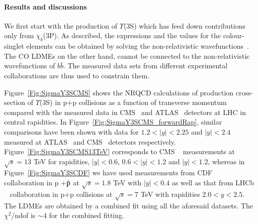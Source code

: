 \paragraph{Results and discussions}
\label{sec:results}
We first start with the production of $\Upsilon$(3S) which has feed down contributions
only from $\chi_{b}$(3P).
As described, the expressions and the values for the 
colour-singlet elements can be obtained by solving the non-relativistic 
wavefunctions~\cite{Cho:1995vh}. 
The CO LDMEs on the other hand, cannot be connected to the non-relativistic
wavefunctions of $b \bar b$. 
The measured data sets from different experimental collaborations are thus used to constrain them.

Figure~\ref{Fig:SigmaY3SCMS} shows the NRQCD calculations of production cross-section of 
$\Upsilon$(3S) in p+p collisions as a function of transverse momentum compared with the 
measured data in CMS~\cite{Khachatryan:2015qpa} and ATLAS~\cite{Aad:2012dlq} 
detectors at LHC in central rapidities. In Figure~\ref{Fig:SigmaY3SCMS_forwardRap},
similar comparisons have been shown with data for $1.2<|y|<2.25$ and $|y|<2.4$
measured at ATLAS~\cite{Aad:2012dlq} and CMS~\cite{Chatrchyan:2013yna} detectors 
respectively. Figure~\ref{Fig:SigmaY3SCMS13TeV} corresponds to CMS ~\cite{Sirunyan:2017qdw}
measurements at $\sqrt{s}=13$ TeV for rapidities, $|y|<0.6$, $0.6<|y|<1.2$ and $|y|<1.2$, whereas in 
Figure~\ref{Fig:SigmaY3SCDF} we have used measurements from CDF~\cite{Acosta:2001gv}
collaboration in p +{$\bar {\rm p}$} at $\sqrt{s}=1.8$ TeV with $|y|<0.4$ as well as
that from LHCb ~\cite{LHCb:2012aa}
collaboration in p+p collisions at $\sqrt{s}=7$ TeV with rapidities $2.0<y<2.5$.
The LDMEs are obtained by a combined fit using all the aforesaid datasets.
The $\chi^2$/ndof is $\sim 4 $ for the combined fitting.

